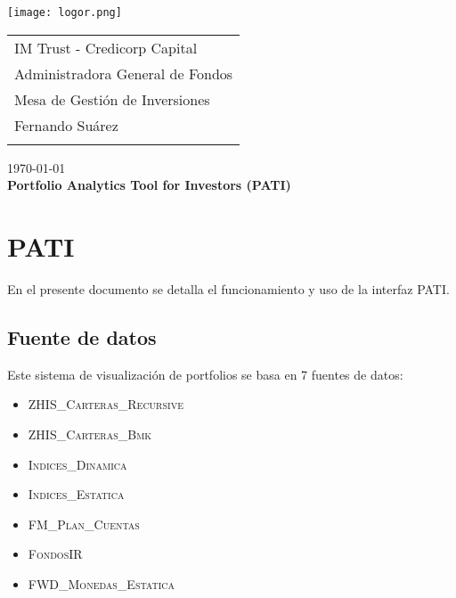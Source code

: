 \documentclass{article}
\begin{document}
\texttt{[image: logor.png]}
\vspace*{-1.55cm}

\hspace*{1.4 cm}
 \hspace*{2.9 cm}
 {\footnotesize
 \begin{tabular}{l}
  \sc IM Trust - Credicorp Capital\\
  \sc Administradora General de Fondos \\
  \sc Mesa de Gestión de Inversiones  \\
  \sc Fernando Suárez  \\
  \vspace{15\baselineskip}\mbox{}
  \vspace{-3mm}\mbox{}
 \end{tabular}
}

 \bigskip

\vspace*{5mm}
\begin{center}
{\today} \\
\vspace{3mm}
{\Large\bf Portfolio Analytics Tool for Investors (PATI)} \\
\vspace{2mm}
\end{center}
\section{PATI}


En el presente documento se detalla el funcionamiento y uso de la interfaz PATI. 

\subsection{Fuente de datos}

Este sistema de visualización de portfolios se basa en 7 fuentes de datos:
\begin{itemize}
\item \textsc{ZHIS\_Carteras\_Recursive}
\item \textsc{ZHIS\_Carteras\_Bmk}
\item \textsc{Indices\_Dinamica}
\item \textsc{Indices\_Estatica}
\item \textsc{FM\_Plan\_Cuentas}
\item \textsc{FondosIR}
\item \textsc{FWD\_Monedas\_Estatica}
\end{itemize}
\end{document}
